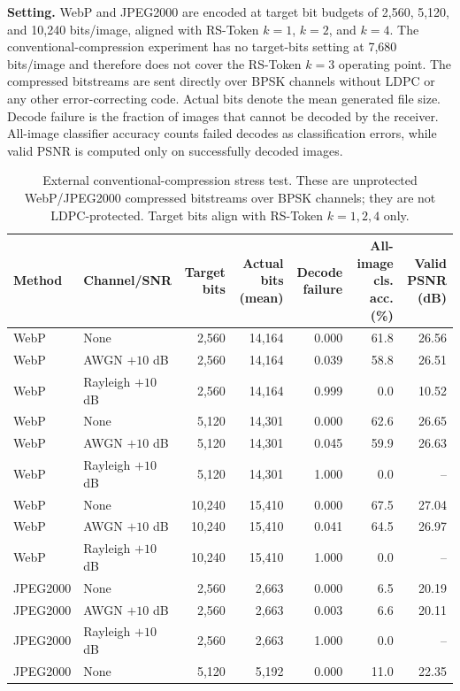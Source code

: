 \documentclass[lettersize,journal]{IEEEtran}
\begin{document}
\textbf{Setting.} WebP and JPEG2000 are encoded at target bit budgets of 2{,}560, 5{,}120, and 10{,}240 bits/image, aligned with RS-Token $k=1$, $k=2$, and $k=4$. The conventional-compression experiment has no target-bits setting at 7{,}680 bits/image and therefore does not cover the RS-Token $k=3$ operating point. The compressed bitstreams are sent directly over BPSK channels without LDPC or any other error-correcting code. Actual bits denote the mean generated file size. Decode failure is the fraction of images that cannot be decoded by the receiver. All-image classifier accuracy counts failed decodes as classification errors, while valid PSNR is computed only on successfully decoded images.

\begin{table}[!t]
\centering
\caption{External conventional-compression stress test. These are unprotected WebP/JPEG2000 compressed bitstreams over BPSK channels; they are not LDPC-protected. Target bits align with RS-Token $k=1,2,4$ only.}
\label{tab:classic_unprotected}
\begin{tabular}{@{}llrrrrr@{}}
\toprule
Method & Channel/SNR & Target bits & Actual bits (mean) & Decode failure & All-image cls. acc. (\%) & Valid PSNR (dB) \\
\midrule
WebP & None & 2{,}560 & 14{,}164 & 0.000 & 61.8 & 26.56 \\
WebP & AWGN $+10$ dB & 2{,}560 & 14{,}164 & 0.039 & 58.8 & 26.51 \\
WebP & Rayleigh $+10$ dB & 2{,}560 & 14{,}164 & 0.999 & 0.0 & 10.52 \\
WebP & None & 5{,}120 & 14{,}301 & 0.000 & 62.6 & 26.65 \\
WebP & AWGN $+10$ dB & 5{,}120 & 14{,}301 & 0.045 & 59.9 & 26.63 \\
WebP & Rayleigh $+10$ dB & 5{,}120 & 14{,}301 & 1.000 & 0.0 & -- \\
WebP & None & 10{,}240 & 15{,}410 & 0.000 & 67.5 & 27.04 \\
WebP & AWGN $+10$ dB & 10{,}240 & 15{,}410 & 0.041 & 64.5 & 26.97 \\
WebP & Rayleigh $+10$ dB & 10{,}240 & 15{,}410 & 1.000 & 0.0 & -- \\
\midrule
JPEG2000 & None & 2{,}560 & 2{,}663 & 0.000 & 6.5 & 20.19 \\
JPEG2000 & AWGN $+10$ dB & 2{,}560 & 2{,}663 & 0.003 & 6.6 & 20.11 \\
JPEG2000 & Rayleigh $+10$ dB & 2{,}560 & 2{,}663 & 1.000 & 0.0 & -- \\
JPEG2000 & None & 5{,}120 & 5{,}192 & 0.000 & 11.0 & 22.35 \\

\end{tabular}
\end{table}
\end{document}
